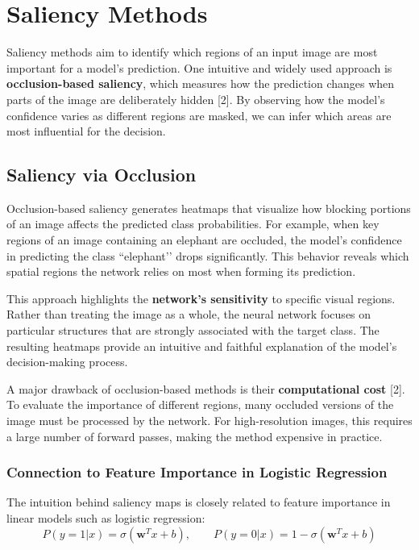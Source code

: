 \documentclass{article}
\renewcommand{\cite}[1]{[#1]}
\begin{document}
\section{Saliency Methods}

Saliency methods aim to identify which regions of an input image are most important for a model’s prediction. One intuitive and widely used approach is \textbf{occlusion-based saliency}, which measures how the prediction changes when parts of the image are deliberately hidden \cite{2}. By observing how the model’s confidence varies as different regions are masked, we can infer which areas are most influential for the decision.

\subsection{Saliency via Occlusion}

Occlusion-based saliency generates heatmaps that visualize how blocking portions of an image affects the predicted class probabilities. For example, when key regions of an image containing an elephant are occluded, the model’s confidence in predicting the class ``elephant’’ drops significantly. This behavior reveals which spatial regions the network relies on most when forming its prediction.

This approach highlights the \textbf{network’s sensitivity} to specific visual regions. Rather than treating the image as a whole, the neural network focuses on particular structures that are strongly associated with the target class. The resulting heatmaps provide an intuitive and faithful explanation of the model’s decision-making process.

A major drawback of occlusion-based methods is their \textbf{computational cost} \cite{2}. To evaluate the importance of different regions, many occluded versions of the image must be processed by the network. For high-resolution images, this requires a large number of forward passes, making the method expensive in practice.

\subsubsection*{Connection to Feature Importance in Logistic Regression}

The intuition behind saliency maps is closely related to feature importance in linear models such as logistic regression:
\[
P(y = 1|x) = \sigma(\mathbf{w}^T x + b), \qquad 
P(y = 0|x) = 1 - \sigma(\mathbf{w}^T x + b)
\]
\end{document}
